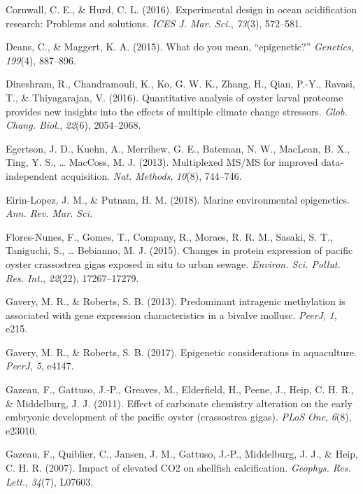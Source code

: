 \documentclass [11pt, proquest] {uwthesis}[2015/03/03]
\newlength{\cslhangindent}
\newenvironment{CSLReferences}%
{\setlength{\parindent}{0pt}%
\everypar{\setlength{\hangindent}{\cslhangindent}}\ignorespaces}%
{\par}
\begin{document}
\begin{CSLReferences}{1}{0}
\leavevmode\hypertarget{ref-Cornwall2016}{}%
Cornwall, C. E., \& Hurd, C. L. (2016). Experimental design in ocean acidification research: Problems and solutions. \emph{ICES J. Mar. Sci.}, \emph{73}(3), 572--581.

\leavevmode\hypertarget{ref-Deans2015}{}%
Deans, C., \& Maggert, K. A. (2015). What do you mean, {``epigenetic?''} \emph{Genetics}, \emph{199}(4), 887--896.

\leavevmode\hypertarget{ref-Dineshram2016}{}%
Dineshram, R., Chandramouli, K., Ko, G. W. K., Zhang, H., Qian, P.-Y., Ravasi, T., \& Thiyagarajan, V. (2016). Quantitative analysis of oyster larval proteome provides new insights into the effects of multiple climate change stressors. \emph{Glob. Chang. Biol.}, \emph{22}(6), 2054--2068.

\leavevmode\hypertarget{ref-Egertson2013}{}%
Egertson, J. D., Kuehn, A., Merrihew, G. E., Bateman, N. W., MacLean, B. X., Ting, Y. S., \ldots{} MacCoss, M. J. (2013). Multiplexed {MS/MS} for improved data-independent acquisition. \emph{Nat. Methods}, \emph{10}(8), 744--746.

\leavevmode\hypertarget{ref-Eirin-Lopez2018}{}%
Eirin-Lopez, J. M., \& Putnam, H. M. (2018). Marine environmental epigenetics. \emph{Ann. Rev. Mar. Sci.}

\leavevmode\hypertarget{ref-Flores-Nunes2015}{}%
Flores-Nunes, F., Gomes, T., Company, R., Moraes, R. R. M., Sasaki, S. T., Taniguchi, S., \ldots{} Bebianno, M. J. (2015). Changes in protein expression of pacific oyster crassostrea gigas exposed in situ to urban sewage. \emph{Environ. Sci. Pollut. Res. Int.}, \emph{22}(22), 17267--17279.

\leavevmode\hypertarget{ref-Gavery2013}{}%
Gavery, M. R., \& Roberts, S. B. (2013). Predominant intragenic methylation is associated with gene expression characteristics in a bivalve mollusc. \emph{PeerJ}, \emph{1}, e215.

\leavevmode\hypertarget{ref-Gavery2017}{}%
Gavery, M. R., \& Roberts, S. B. (2017). Epigenetic considerations in aquaculture. \emph{PeerJ}, \emph{5}, e4147.

\leavevmode\hypertarget{ref-Gazeau2011}{}%
Gazeau, F., Gattuso, J.-P., Greaves, M., Elderfield, H., Peene, J., Heip, C. H. R., \& Middelburg, J. J. (2011). Effect of carbonate chemistry alteration on the early embryonic development of the pacific oyster (crassostrea gigas). \emph{PLoS One}, \emph{6}(8), e23010.

\leavevmode\hypertarget{ref-Gazeau2007}{}%
Gazeau, F., Quiblier, C., Jansen, J. M., Gattuso, J.-P., Middelburg, J. J., \& Heip, C. H. R. (2007). Impact of elevated {CO2} on shellfish calcification. \emph{Geophys. Res. Lett.}, \emph{34}(7), L07603.


\end{CSLReferences}
\end{document}
